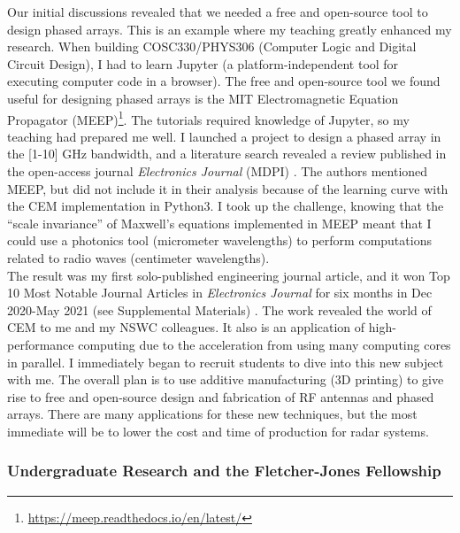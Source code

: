 \documentclass[../../../main.tex]{subfiles}
\begin{document}
Our initial discussions revealed that we needed a free and open-source tool to design phased arrays.  This is an example where my teaching greatly enhanced my research.  When building COSC330/PHYS306 (Computer Logic and Digital Circuit Design), I had to learn Jupyter (a platform-independent tool for executing computer code in a browser).  The free and open-source tool we found useful for designing phased arrays is the MIT Electromagnetic Equation Propagator (MEEP)\footnote{\url{https://meep.readthedocs.io/en/latest/}}.  The tutorials required knowledge of Jupyter, so my teaching had prepared me well.  I launched a project to design a phased array in the [1-10] GHz bandwidth, and a literature search revealed a review published in the open-access journal \textit{Electronics Journal} (MDPI) \cite{10.3390/electronics8121506}.  The authors mentioned MEEP, but did not include it in their analysis because of the learning curve with the CEM implementation in Python3.  I took up the challenge, knowing that the ``scale invariance'' of Maxwell's equations implemented in MEEP meant that I could use a photonics tool (micrometer wavelengths) to perform computations related to radio waves (centimeter wavelengths).
\\
\vspace{0.15cm}
The result was my first solo-published engineering journal article, and it won Top 10 Most Notable Journal Articles in \textit{Electronics Journal} for six months in Dec 2020-May 2021 (see Supplemental Materials) \cite{electronics10040415}.  The work revealed the world of CEM to me and my NSWC colleagues.  It also is an application of high-performance computing due to the acceleration from using many computing cores in parallel.  I immediately began to recruit students to dive into this new subject with me.  The overall plan is to use additive manufacturing (3D printing) to give rise to free and open-source design and fabrication of RF antennas and phased arrays.  There are many applications for these new techniques, but the most immediate will be to lower the cost and time of production for radar systems.

\subsubsection{Undergraduate Research and the Fletcher-Jones Fellowship}
\end{document}

